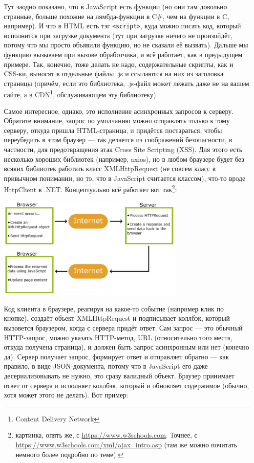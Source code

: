 \documentclass{../../text-style}
\begin{document}
Тут заодно показано, что в JavaScript есть функции (но они там довольно странные, больше похожие на лямбда-функции в C\#, чем на функции в C, например). И что в HTML есть тэг \texttt{<script>}, куда можно писать код, который исполнится при загрузке документа (тут при загрузке ничего не произойдёт, потому что мы просто объявили функцию, но не сказали её вызвать). Дальше мы функцию вызываем при вызове обработчика, и всё работает, как в предыдущем примере. Так, конечно, тоже делать не надо, содержательные скрипты, как и CSS-ки, выносят в отдельные файлы .js и ссылаются на них из заголовка страницы (причём, если это библиотека, .js-файл может лежать даже не на вашем сайте, а в CDN\footnote{Content Delivery Network}, обслуживающем эту библиотеку).

Самое интересное, однако, это исполнение асинхронных запросов к серверу. Обратите внимание, запрос по умолчанию можно отправлять только к тому серверу, откуда пришла HTML-страница, и придётся постараться, чтобы переубедить в этом браузер --- так делается из соображений безопасности, в частности, для предотвращения атак Cross Site Scripting (XSS). Для этого есть несколько хороших библиотек (например, axios), но в любом браузере будет без всяких библиотек работать класс XMLHttpRequest (не совсем класс в привычном понимании, но то, что в JavaScript считается классом), что-то вроде HttpClient в .NET. Концептуально всё работает вот так\footnote{картинка, опять же, с \url{https://www.w3schools.com}. Точнее, с \url{https://www.w3schools.com/xml/ajax_intro.asp} (там же можно почитать немного более подробно по теме).}:

\begin{center}
    \includegraphics[width=0.7\textwidth]{ajax.png}
\end{center}

Код клиента в браузере, реагируя на какое-то событие (например клик по кнопке), создаёт объект XMLHttpRequest и подписывает коллбэк, который вызовется браузером, когда с сервера придёт ответ. Сам запрос --- это обычный HTTP-запрос, можно указать HTTP-метод, URL (относительно того места, откуда получена страница), и должен быть запрос асинхронным или нет (конечно да). Сервер получает запрос, формирует ответ и отправляет обратно --- как правило, в виде JSON-документа, потому что в JavaScript его даже десериализовывать не нужно, это сразу валидный объект. Браузер принимает ответ от сервера и исполняет коллбэк, который и обновляет содержимое (обычно, хотя может этого не делать). Вот пример:
\end{document}
